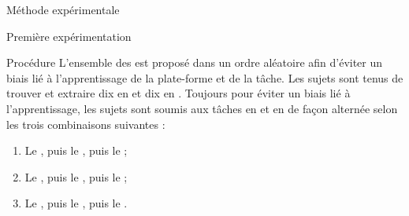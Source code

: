 \documentclass[myfrancais,ngerman,english,frenchb]{mythesis}
\begin{document}
\begin{mychapter}{Méthode expérimentale}
\begin{mysection}{Première expérimentation}
\begin{mysubsection}{Procédure}
				L'ensemble des  est proposé dans un ordre aléatoire afin d'éviter un biais lié à l'apprentissage de la plate-forme et de la tâche.
				Les sujets sont tenus de trouver et extraire dix  en  et dix  en .
				Toujours pour éviter un biais lié à l'apprentissage, les sujets sont soumis aux tâches en  et en  de façon alternée selon les trois combinaisons suivantes :
				\begin{enumerate}
					\item Le  , puis le  , puis le  ;
					\item Le  , puis le  , puis le  ;
					\item Le  , puis le  , puis le  .
				\end{enumerate}


\end{mysubsection}
\end{mysection}
\end{mychapter}
\end{document}
